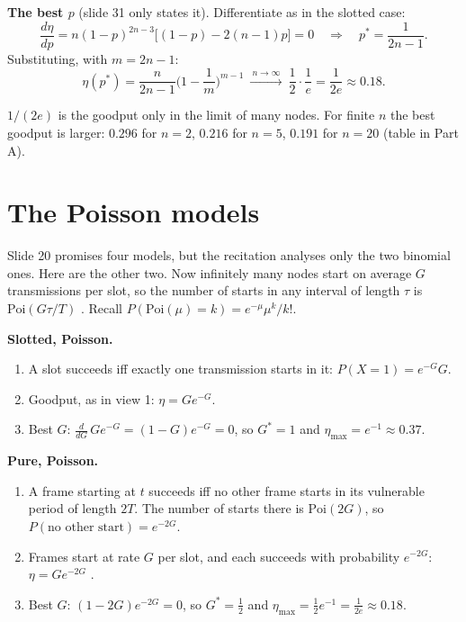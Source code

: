 \textbf{The best $p$} (slide 31 only states it). Differentiate as in the slotted case:
\[ \frac{d\eta}{dp} = n(1-p)^{2n-3}\big[(1-p) - 2(n-1)p\big] = 0\quad\Longrightarrow\quad p^* = \frac{1}{2n-1}. \]
Substituting, with $m = 2n-1$:
\[ \eta(p^*) = \frac{n}{2n-1}\Big(1-\frac1m\Big)^{m-1}\ \xrightarrow{\ n\to\infty\ }\ \frac12\cdot\frac1e = \frac1{2e}\approx0.18. \]

\begin{pitfall}
$1/(2e)$ is the goodput only in the limit of many nodes. For finite $n$ the best goodput is larger: $0.296$ for $n=2$, $0.216$ for $n=5$, $0.191$ for $n=20$ (table in Part A).
\end{pitfall}

\section{The Poisson models}\label{sec:poisson}

Slide 20 promises four models, but the recitation analyses only the two binomial ones. Here are the other two. Now infinitely many nodes start on average $G$ transmissions per slot,
so the number of starts in any interval of length $\tau$ is $\text{Poi}(G\tau/T)$ . Recall $P(\text{Poi}(\mu) = k) = e^{-\mu}\mu^k/k!$.

\textbf{Slotted, Poisson.}
\begin{enumerate}
  \item A slot succeeds iff exactly one transmission starts in it: $P(X=1) = e^{-G}G$.
  \item Goodput, as in view 1: $\eta = Ge^{-G}$.
  \item Best $G$: $\frac{d}{dG}\,Ge^{-G} = (1-G)e^{-G} = 0$, so $G^*=1$ and $\eta_{\max} = e^{-1}\approx0.37$.
\end{enumerate}

\textbf{Pure, Poisson.}
\begin{enumerate}
  \item A frame starting at $t$ succeeds iff no other frame starts in its vulnerable period of length $2T$. The number of starts there is $\text{Poi}(2G)$, so $P(\text{no other start}) = e^{-2G}$.
  \item Frames start at rate $G$ per slot, and each succeeds with probability $e^{-2G}$: $\eta = Ge^{-2G}$ .
  \item Best $G$: $(1-2G)e^{-2G} = 0$, so $G^* = \frac12$ and $\eta_{\max} = \frac12e^{-1} = \frac1{2e}\approx0.18$.
\end{enumerate}

